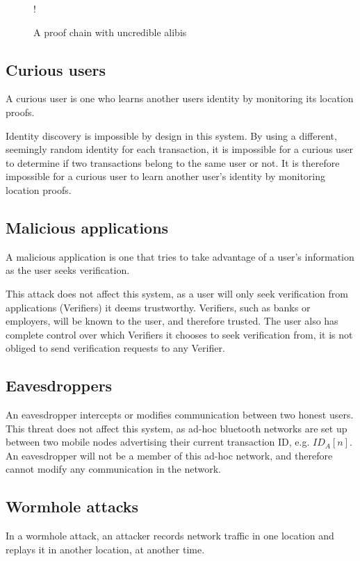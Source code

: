\begin{figure}[H]
\begin{center}
\resizebox {0.6\columnwidth} {!} {}
\vspace{-3.25cm}
\caption{A proof chain with uncredible alibis}
\label{fig:uncredible_tree}
\end{center}
\end{figure}

\subsection{Curious users}
A curious user is one who learns another users identity by monitoring its location proofs.

Identity discovery is impossible by design in this system. By using a different, seemingly random identity for each transaction, it is impossible for a curious user to determine if two transactions belong to the same user or not. It is therefore impossible for a curious user to learn another user's identity by monitoring location proofs.

\subsection{Malicious applications}
A malicious application is one that tries to take advantage of a user's information as the user seeks verification.

This attack does not affect this system, as a user will only seek verification from applications (Verifiers) it deems trustworthy. Verifiers, such as banks or employers, will be known to the user, and therefore trusted. The user also has complete control over which Verifiers it chooses to seek verification from, it is not obliged to send verification requests to any Verifier.

\subsection{Eavesdroppers}
An eavesdropper intercepts or modifies communication between two honest users. This threat does not affect this system, as ad-hoc bluetooth networks are set up between two mobile nodes advertising their current transaction ID, e.g. $ID_A[n]$. An eavesdropper will not be a member of this ad-hoc network, and therefore cannot modify any communication in the network.

\subsection{Wormhole attacks}
In a wormhole attack, an attacker records network traffic in one location and replays it in another location, at another time.

